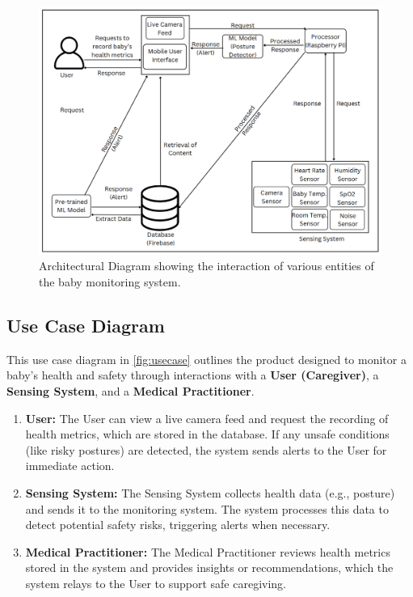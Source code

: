 \documentclass[12pt,a4paper]{report}
\begin{document}
\begin{figure}[hbtp]
  \centering
  \includegraphics[scale=0.55]{./pic/finarch.png}
  \caption{Architectural Diagram showing the interaction of various entities of the baby monitoring system.}
  \label{fig:architecture}
\end{figure}
\subsection{Use Case Diagram}

This use case diagram in \ref{fig:usecase} outlines the product designed to monitor a baby’s health and safety through interactions with a \textbf{User (Caregiver)}, a \textbf{Sensing System}, and a \textbf{Medical Practitioner}.

\begin{enumerate}
    \item \textbf{User:} The User can view a live camera feed and request the recording of health metrics, which are stored in the database. If any unsafe conditions (like risky postures) are detected, the system sends alerts to the User for immediate action.
    
    \item \textbf{Sensing System:} The Sensing System collects health data (e.g., posture) and sends it to the monitoring system. The system processes this data to detect potential safety risks, triggering alerts when necessary.
    
    \item \textbf{Medical Practitioner:} The Medical Practitioner reviews health metrics stored in the system and provides insights or recommendations, which the system relays to the User to support safe caregiving.
\end{enumerate}
\end{document}
